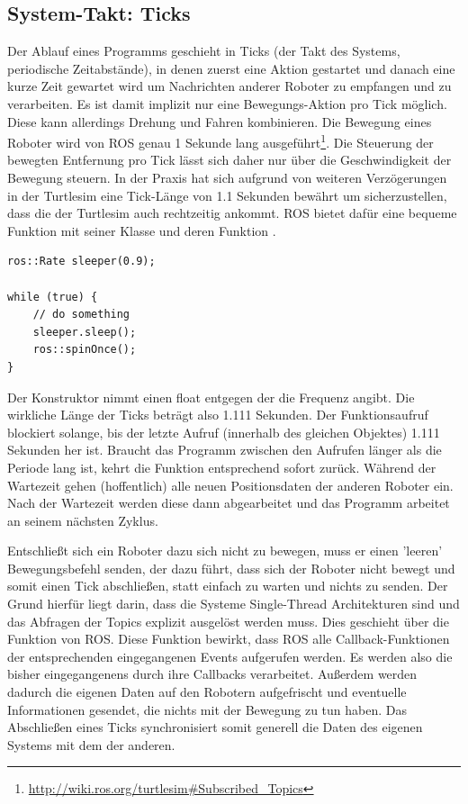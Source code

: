 \subsection*{System-Takt: Ticks}\label{subsec:Tick}

Der Ablauf eines Programms geschieht in Ticks (der Takt des Systems, periodische Zeitabstände), in denen zuerst eine Aktion gestartet und danach eine kurze Zeit gewartet wird um Nachrichten anderer Roboter zu empfangen und zu verarbeiten. Es ist damit implizit nur eine Bewegungs-Aktion pro Tick möglich. Diese kann allerdings Drehung und Fahren kombinieren.
Die Bewegung eines Roboter wird von \ac{ROS} genau 1 Sekunde lang ausgeführt\footnote{\url{http://wiki.ros.org/turtlesim\#Subscribed_Topics}}. Die Steuerung der bewegten Entfernung pro Tick lässt sich daher nur über die Geschwindigkeit der Bewegung steuern. In der Praxis hat sich aufgrund von weiteren Verzögerungen in der Turtlesim eine Tick-Länge von 1.1 Sekunden bewährt um sicherzustellen, dass die  der Turtlesim auch rechtzeitig ankommt. \ac{ROS} bietet dafür eine bequeme Funktion mit seiner Klasse  und deren Funktion .

\begin{lstlisting}[style=cpp, title=Ticks abschließen mit ROS Funktionen]
ros::Rate sleeper(0.9);
        
while (true) {
	// do something
	sleeper.sleep();
	ros::spinOnce();
}
\end{lstlisting}

Der Konstruktor nimmt einen float entgegen der die Frequenz angibt. Die wirkliche Länge der Ticks beträgt also 1.111 Sekunden. Der Funktionsaufruf  blockiert solange, bis der letzte Aufruf (innerhalb des gleichen Objektes) 1.111 Sekunden her ist. Braucht das Programm zwischen den Aufrufen länger als die Periode lang ist, kehrt die Funktion entsprechend sofort zurück.
Während der Wartezeit gehen (hoffentlich) alle neuen Positionsdaten der anderen Roboter ein. Nach der Wartezeit werden diese dann abgearbeitet und das Programm arbeitet an seinem nächsten Zyklus.

Entschließt sich ein Roboter dazu sich nicht zu bewegen, muss er einen 'leeren' Bewegungsbefehl senden, der dazu führt, dass sich der Roboter nicht bewegt und somit einen Tick abschließen, statt einfach zu warten und nichts zu senden. Der Grund hierfür liegt darin, dass die Systeme Single-Thread Architekturen sind und das Abfragen der Topics explizit ausgelöst werden muss. Dies geschieht über die Funktion  von \ac{ROS}. Diese Funktion bewirkt, dass \ac{ROS} alle Callback-Funktionen der entsprechenden eingegangenen Events aufgerufen werden. Es werden also die bisher eingegangenens durch ihre Callbacks verarbeitet. Außerdem werden dadurch die eigenen Daten auf den Robotern aufgefrischt und eventuelle Informationen gesendet, die nichts mit der Bewegung zu tun haben. Das Abschließen eines Ticks synchronisiert somit generell die Daten des eigenen Systems mit dem der anderen.

